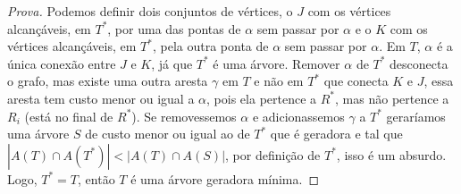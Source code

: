 \documentclass[12pt]{article}
\begin{document}
\begin{proof}[Prova]
Podemos definir dois conjuntos de vértices, o $J$ com os vértices alcançáveis, em $T^*$, por uma das pontas de $\alpha$ sem passar por $\alpha$ e o $K$ com os vértices alcançáveis, em $T^*$, pela outra ponta de $\alpha$ sem passar por $\alpha$. Em $T$, $\alpha$ é a única conexão entre $J$ e $K$, já que $T^*$ é uma árvore. Remover $\alpha$ de $T^*$ desconecta o grafo, mas existe uma outra aresta $\gamma$ em $T$ e não em $T^*$ que conecta $K$ e $J$, essa aresta tem custo menor ou igual a $\alpha$, pois ela pertence a $R^*$, mas não pertence a $R_i$ (está no final de $R^*$). Se removessemos $\alpha$ e adicionassemos $\gamma$ a $T^*$ geraríamos uma árvore $S$ de custo menor ou igual ao de $T^*$ que é geradora e tal que $|A(T) \cap A(T^*)| < |A(T) \cap A(S)|$, por definição de $T^*$, isso é um absurdo. \\
Logo, $T^* = T$, então $T$ é uma árvore geradora mínima.
\end{proof}
\end{document}
